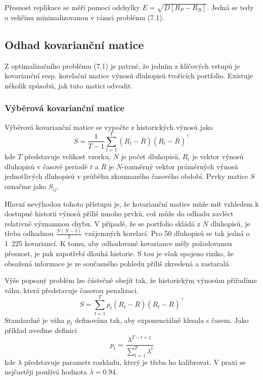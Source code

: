 \documentclass[a4paper]{book}
\begin{document}
Přesnost replikace se měří pomocí odchylky $E = \sqrt{D[R_P - R_B]}$. Jedná se tedy o veličinu minimalizovanou v rámci problému (7.1).

\subsection{Odhad kovarianční matice}

Z optimalizačního problému (7.1) je patrné, že jedním z klíčových vstupů je kovarianční resp. korelační matice výnosů dluhopisů tvořících portfolio. Existuje několik způsobů, jak tuto matici odvodit.

\subsubsection{Výběrová kovarianční matice}

Výběrová kovarianční matice se vypočte z historických výnosů jako
\begin{equation*}
S = \frac{1}{T-1}\sum_{t=1}^T(R_t - \overline{R})(R_t - \overline{R})^{\top}
\end{equation*}
kde $T$ představuje velikost vzorku, $N$ je počet dluhopisů, $R_t$ je vektor výnosů dluhopisů v časové periodě $t$ a $\overline{R}$ je $N$-rozměrný vektor průměrných výnosů jednotlivých dluhopisů v průběhu zkoumaného časového období. Prvky matice $S$ označme jako $S_{ij}$.

Hlavní nevýhodou tohoto přístupu je, že kovarianční matice může mít vzhledem k dostupné historii výnosů příliš mnoho prvků, což může do odhadu zavléct relativně významnou chybu. V případě, že se portfolio skládá z $N$ dluhopisů, je třeba odhadnou $\frac{N(N-1)}{2}$ vzájemných korelací. Pro 50 dluhopisů se tak jedná o 1~225 kovariancí. K tomu, aby odhadované kovariance měly požadovanou přesnost, je pak zapotřebí dlouhá historie. S tou je však spojeno riziko, že obsažená informace je ze současného pohledu příliš zkreslená a zastaralá. 

Výše popsaný problém lze částečně obejít tak, že historickým výnosům přiřadíme váhu, která představuje časovou penalizaci.
\begin{equation*}
S = \sum_{t=1}^T p_t(R_t - \overline{R})(R_t - \overline{R})^{\top}
\end{equation*}
Standardně je váha $p_t$ definována tak, aby exponenciálně klesala s časem. Jako příklad uveďme definici
\begin{equation*}
p_t = \frac{\lambda^{T-t+1}}{\sum_{t=1}^T \lambda^t}
\end{equation*}
kde $\lambda$ představuje parametr rozkladu, který je třeba ho kalibrovat. V praxi se nejčastěji používá hodnota $\lambda = 0.94$.
\end{document}
